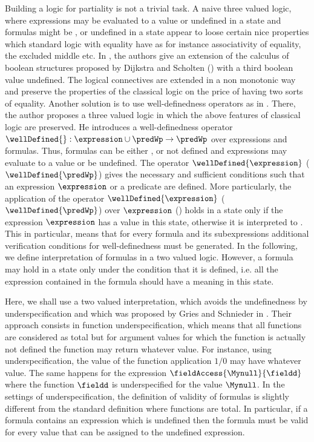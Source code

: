 Building a logic for partiality is not a trivial task. A naive three valued logic, where expressions may be evaluated to a value or  undefined  in a state and
 formulas might be \false{}, \true{} or undefined in a state appear to loose certain nice properties
 which standard logic with equality have
as for instance associativity of equality, the excluded middle \cite{gries95avoiding} etc. In \cite{schieder99adapting},  the authors give 
  an extension  of the calculus of boolean structures proposed by Dijkstra and Scholten (\cite{WPCDS}) with a  third boolean value 
undefined.  The logical connectives are extended in a non monotonic way and preserve the properties of the classical logic
on the price  of having two sorts of equality.
Another solution is to use well-definedness operators as in \cite{burdy98treatment}.
There, the author proposes a three valued logic in which the above features of classical logic are preserved.
He introduces a well-definedness operator $\wellDefined{}: \expression \cup \predWp \rightarrow \predWp$
 over expressions and formulas. Thus, formulas can be either \true{}, \false{} or not defined and
expressions may evaluate to a value or be undefined. The operator  $\wellDefined{\expression}$ ($\wellDefined{\predWp}$) 
 gives the necessary and sufficient
 conditions such that an expression $\expression$ or a predicate \predWp{} are defined.
 More particularly, the application of the operator   $\wellDefined{\expression}$  ($\wellDefined{\predWp}$) over $\expression$  (\predWp ) 
 holds in a state only if the expression $\expression$ has  a value in this state, otherwise it is interpreted to \false{}.
 This in particular, means that for every formula and its subexpressions additional verification conditions for well-definedness must be generated.
 In the following, we define interpretation of formulas  in a two valued logic. However, a formula may hold in a state only under the condition that
 it is  defined, i.e. all the expression contained in the formula should have a meaning in  this state.
 
 Here, we shall use a two valued interpretation, which avoids the undefinedness
by underspecification and which was proposed by Gries and Schnieder   in \cite{gries95avoiding}.
 Their approach consists in function underspecification, which means that
 all functions are considered  as total but for argument values for which the function is actually 
not defined the function may return whatever value. For instance, using underspecification, the value of the function application  $1/0$  
may have whatever value. The same happens for the expression $\fieldAccess{\Mynull}{\fieldd}$ where the function $\fieldd$ is underspecified for 
the value $\Mynull$. In the settings of underspecification, the definition of validity of formulas is slightly different from the standard
definition where functions are total.  In particular, if a formula \predWp{} contains an expression which is undefined
then the formula must be valid for every value that can be assigned to the undefined expression.


